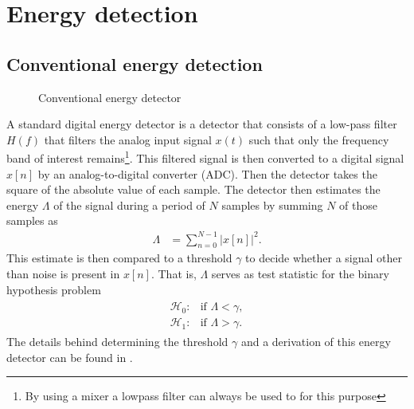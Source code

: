 \documentclass[a4paper, openany, oneside]{memoir}
\begin{document}
\section{Energy detection}

\subsection{Conventional energy detection}\label{sec:conv_ed}
\begin{figure}[H]
\centering
{}
\caption{Conventional energy detector}\label{tkz:conv_ed}
\end{figure}
A standard digital energy detector\cite{atapattu2014energy} is a detector that consists of a low-pass filter $H(f)$ that filters the analog input signal $x(t)$ such
that only the frequency band of interest remains\footnote{By using a mixer a lowpass filter can always be used to for this purpose}. This filtered signal is then converted to a digital signal $x[n]$ by an analog-to-digital converter (ADC). Then the detector takes the square of the absolute value of each sample. The detector then estimates the energy $\Lambda$ of the signal during a period of $N$ samples by summing $N$ of those samples as
\begin{align}\label{eq:test_ed}
	\Lambda &= \sum_{n=0}^{N-1} |x[n]|^2.
\end{align}
This estimate is then compared to a threshold $\gamma$ to decide whether a signal other than noise is present in $x[n]$. That is, $\Lambda$ serves as test statistic for the binary hypothesis problem
\begin{align*}
	\begin{array}{ll}
		\mathcal{H}_0: & \text{if } \Lambda < \gamma, \\
		\mathcal{H}_1: & \text{if } \Lambda > \gamma.
	\end{array}
\end{align*}
The details behind determining the threshold $\gamma$ and a derivation of this energy detector can be found in .
\end{document}

